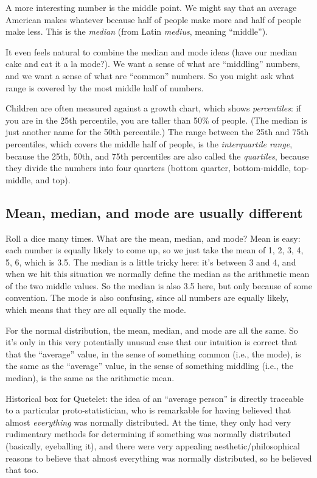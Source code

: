 A more interesting number is the middle point. We might say that an
average American makes whatever because half of people make more and
half of people make less. This is the \emph{median} (from Latin
\emph{medius}, meaning ``middle'').

It even feels natural to combine the median and mode ideas (have our
median cake and eat it a la mode?). We want a sense of what are
``middling'' numbers, and we want a sense of what are ``common''
numbers. So you might ask what range is covered by the most middle half
of numbers.

Children are often measured against a growth chart, which shows
\emph{percentiles}: if you are in the 25th percentile, you are taller
than 50\% of people. (The median is just another name for the 50th
percentile.) The range between the 25th and 75th percentiles, which
covers the middle half of people, is the \emph{interquartile range},
because the 25th, 50th, and 75th percentiles are also called the
\emph{quartiles}, because they divide the numbers into four quarters
(bottom quarter, bottom-middle, top-middle, and top).

\subsection{Mean, median, and mode are usually
different}\label{mean-median-and-mode-are-usually-different}

Roll a dice many times. What are the mean, median, and mode? Mean is
easy: each number is equally likely to come up, so we just take the mean
of 1, 2, 3, 4, 5, 6, which is 3.5. The median is a little tricky here:
it's between 3 and 4, and when we hit this situation we normally define
the median as the arithmetic mean of the two middle values. So the
median is also 3.5 here, but only because of some convention. The mode
is also confusing, since all numbers are equally likely, which means
that they are all equally the mode.

For the normal distribution, the mean, median, and mode are all the
same. So it's only in this very potentially unusual case that our
intuition is correct that that the ``average'' value, in the sense of
something common (i.e., the mode), is the same as the ``average'' value,
in the sense of something middling (i.e., the median), is the same as
the arithmetic mean.

Historical box for Quetelet: the idea of an ``average person'' is
directly traceable to a particular proto-statistician, who is remarkable
for having believed that almost \emph{everything} was normally
distributed. At the time, they only had very rudimentary methods for
determining if something was normally distributed (basically, eyeballing
it), and there were very appealing aesthetic/philosophical reasons to
believe that almost everything was normally distributed, so he believed
that too.
